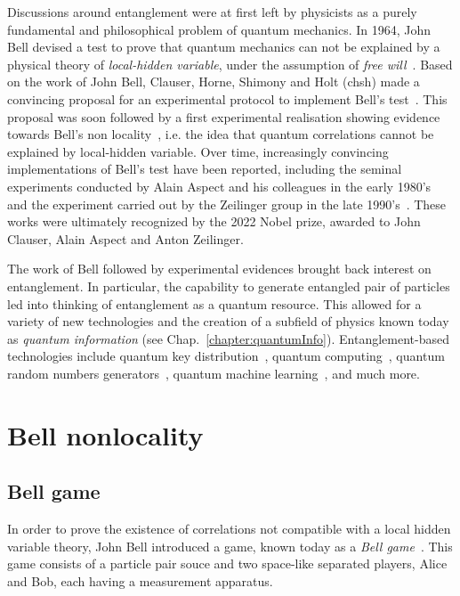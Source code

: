 \medbreak
Discussions around entanglement were at first left by physicists as a purely fundamental and philosophical problem of quantum mechanics.
In 1964, John Bell devised a test to prove that quantum mechanics can not be explained by a physical theory of \textit{local-hidden variable}, under the assumption of \textit{free will}~\cite{Bell1964}. 
Based on the work of John Bell, Clauser, Horne, Shimony and Holt (\acrshort{chsh}) made a convincing proposal for an experimental protocol to implement Bell's test~\cite{Clauser1969}. 
This proposal was soon followed by a first experimental realisation showing evidence towards Bell's non locality~\cite{Freedman1972}, i.e. the idea that quantum correlations cannot be explained by local-hidden variable.
Over time, increasingly convincing implementations of Bell's test have been reported, including the seminal experiments conducted by Alain Aspect and his colleagues in the early 1980's~\cite{Aspect1982,Aspect1982b} and the experiment carried out by the Zeilinger group in the late 1990's~\cite{Weihs1998}.
These works were ultimately recognized by the 2022 Nobel prize, awarded to John Clauser, Alain Aspect and Anton Zeilinger.

\medbreak
The work of Bell followed by experimental evidences brought back interest on entanglement.
In particular, the capability to generate entangled pair of particles led into thinking of entanglement as a quantum resource.
This allowed for a variety of new technologies and the creation of a subfield of physics known today as \textit{quantum information} (see Chap.~\ref{chapter:quantumInfo}).
Entanglement-based technologies include quantum key distribution~\cite{Ekert1991}, quantum computing~\cite{Preskill2018}, quantum random numbers generators~\cite{Acin2016}, quantum machine learning~\cite{Biamonte2017}, and much more. 


\chapter{Bell nonlocality}
\label{section:nonlocality}


\section{Bell game}

In order to prove the existence of correlations not compatible with a local hidden variable theory, John Bell introduced a game, known today as a \textit{Bell game}~\cite{Bell1964}.
This game consists of a particle pair souce and two space-like separated players, Alice and Bob, each having a measurement apparatus.


